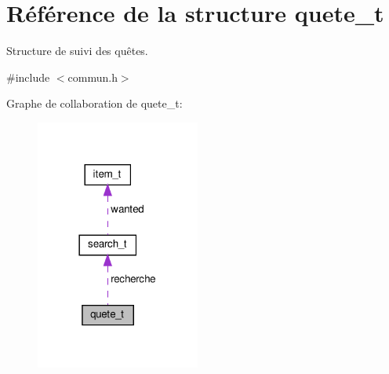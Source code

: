 \hypertarget{structquete__t}{}\section{Référence de la structure quete\+\_\+t}
\label{structquete__t}


Structure de suivi des quêtes.  




{\ttfamily \#include $<$commun.\+h$>$}



Graphe de collaboration de quete\+\_\+t\+:\nopagebreak
\begin{figure}[H]
\begin{center}
\leavevmode
\includegraphics[width=153pt]{structquete__t__coll__graph}
\end{center}
\end{figure}
